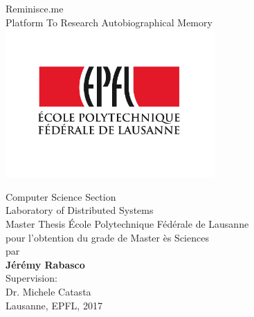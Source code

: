 \begin{titlepage}
\begin{center}
\sffamily


\null\vspace{2cm}
{\huge Reminisce.me \\[12pt] Platform To Research Autobiographical Memory} \\[24pt]
\includegraphics[width=8cm]{images/epfl} 
    
\vfill


Computer Science Section\\
Laboratory of Distributed Systems\\
Master Thesis
\'Ecole Polytechnique F\'ed\'erale de Lausanne\\[6pt]
pour l'obtention du grade de Master \`es Sciences\\
par\\ [4pt]
\vfill
\textbf{J\'er\'emy Rabasco}\\[9pt]
%
\vfill
\small
Supervision:\\
%
Dr. Michele Catasta\\
%
\vfill
Lausanne, EPFL, 2017

\end{center}
\end{titlepage}


